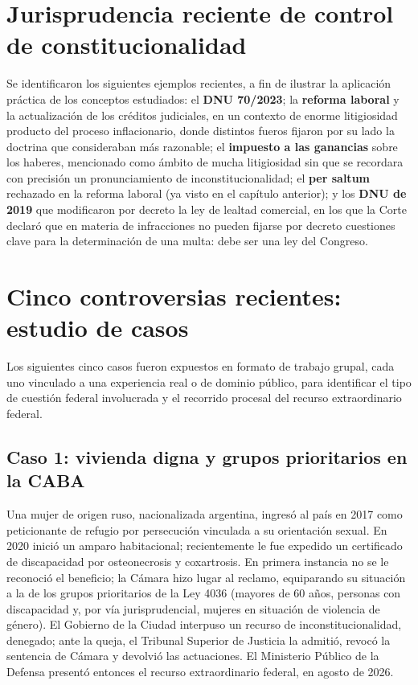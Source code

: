 \documentclass[12pt,oneside]{book}
\begin{document}
\section{Jurisprudencia reciente de control de constitucionalidad}

Se identificaron los siguientes ejemplos recientes, a fin de ilustrar la aplicación práctica de los conceptos estudiados: el \textbf{DNU 70/2023}; la \textbf{reforma laboral} y la actualización de los créditos judiciales, en un contexto de enorme litigiosidad producto del proceso inflacionario, donde distintos fueros fijaron por su lado la doctrina que consideraban más razonable; el \textbf{impuesto a las ganancias} sobre los haberes, mencionado como ámbito de mucha litigiosidad sin que se recordara con precisión un pronunciamiento de inconstitucionalidad; el \textbf{per saltum} rechazado en la reforma laboral (ya visto en el capítulo anterior); y los \textbf{DNU de 2019} que modificaron por decreto la ley de lealtad comercial, en los que la Corte declaró que en materia de infracciones no pueden fijarse por decreto cuestiones clave para la determinación de una multa: debe ser una ley del Congreso.

\section{Cinco controversias recientes: estudio de casos}

Los siguientes cinco casos fueron expuestos en formato de trabajo grupal, cada uno vinculado a una experiencia real o de dominio público, para identificar el tipo de cuestión federal involucrada y el recorrido procesal del recurso extraordinario federal.

\subsection{Caso 1: vivienda digna y grupos prioritarios en la CABA}

Una mujer de origen ruso, nacionalizada argentina, ingresó al país en 2017 como peticionante de refugio por persecución vinculada a su orientación sexual. En 2020 inició un amparo habitacional; recientemente le fue expedido un certificado de discapacidad por osteonecrosis y coxartrosis. En primera instancia no se le reconoció el beneficio; la Cámara hizo lugar al reclamo, equiparando su situación a la de los grupos prioritarios de la Ley 4036 (mayores de 60 años, personas con discapacidad y, por vía jurisprudencial, mujeres en situación de violencia de género). El Gobierno de la Ciudad interpuso un recurso de inconstitucionalidad, denegado; ante la queja, el Tribunal Superior de Justicia la admitió, revocó la sentencia de Cámara y devolvió las actuaciones. El Ministerio Público de la Defensa presentó entonces el recurso extraordinario federal, en agosto de 2026.
\end{document}
